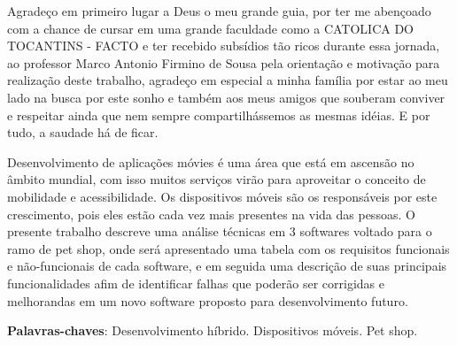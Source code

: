 \documentclass[12pt,openright,twoside,a4paper,english,french,spanish,brazil]{abntex2}
\begin{document}
\begin{agradecimentos}
Agradeço em primeiro lugar a Deus o meu grande guia, por ter me abençoado com a chance de cursar em uma grande faculdade como a CATOLICA DO TOCANTINS - FACTO e ter recebido subsídios tão ricos durante essa jornada, ao professor Marco Antonio Firmino de Sousa pela orientação e motivação para realização deste trabalho, agradeço em especial a minha família por estar ao meu lado na busca por este sonho e também aos meus amigos que souberam conviver e respeitar ainda que nem sempre compartilhássemos as mesmas idéias. E por tudo, a saudade há de ficar.

\end{agradecimentos}

\begin{resumo}
Desenvolvimento de aplicações móvies é uma área que está em ascensão no âmbito mundial, com isso muitos serviços virão para aproveitar o conceito de mobilidade e acessibilidade. Os dispositivos móveis são os responsáveis por este crescimento, pois eles estão cada vez mais presentes na vida das pessoas. O presente trabalho descreve uma análise técnicas em 3 softwares voltado para o ramo de pet shop, onde será apresentado uma tabela com os requisitos funcionais e não-funcionais de cada software, e em seguida uma descrição de suas principais funcionalidades afim de identificar falhas que poderão ser corrigidas e melhorandas em um novo software proposto para desenvolvimento futuro.


 \vspace{\onelineskip}
    
 \noindent
 \textbf{Palavras-chaves}: Desenvolvimento híbrido. Dispositivos  móveis. Pet shop.
\end{resumo}


\listoffigures*
\cleardoublepage


\listoftables*
\cleardoublepage
\end{document}
